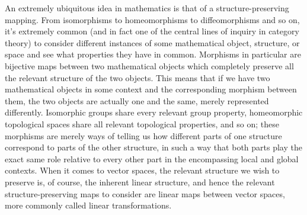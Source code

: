 \documentclass{article}
\newcommand{\nn}{\leavevmode \newline \newline}
\begin{document}
An extremely ubiquitous idea in mathematics is that of a structure-preserving mapping. From isomorphisms to homeomorphisms to diffeomorphisms and so on, it's extremely common (and in fact one of the central lines of inquiry in category theory) to consider different instances of some mathematical object, structure, or space and see what properties they have in common. Morphisms in particular are bijective maps between two mathematical objects which completely preserve all the relevant structure of the two objects. This means that if we have two mathematical objects in some context and the corresponding morphism between them, the two objects are actually one and the same, merely represented differently. Isomorphic groups share every relevant group property, homeomorphic topological spaces share all relevant topological properties, and so on; these morphisms are merely ways of telling us how different parts of one structure correspond to parts of the other structure, in such a way that both parts play the exact same role relative to every other part in the encompassing local and global contexts. When it comes to vector spaces, the relevant structure we wish to preserve is, of course, the inherent linear structure, and hence the relevant structure-preserving maps to consider are linear maps between vector spaces, more commonly called linear transformations.
\nn
\end{document}
